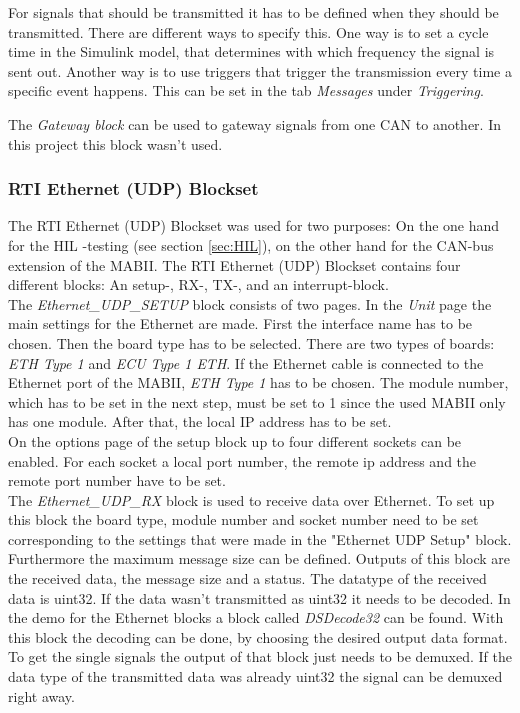 \documentclass[ExampleMasters.tex]{subfiles}
\begin{document}
For signals that should be transmitted it has to be defined when they should be transmitted. There are different ways to specify this. One way is to set a cycle time in the Simulink model, that determines with which frequency the signal is sent out. Another way is to use triggers that trigger the transmission every time a specific event happens. This can be set in the tab \textit{Messages} under \textit{Triggering}.

The \textit{Gateway block} can be used to gateway signals from one \gls{CAN} to another. In this project this block wasn't used. 
\subsubsection{RTI Ethernet (UDP) Blockset}
The \gls{RTI} Ethernet (\gls{UDP}) Blockset was used for two purposes: On the one hand for the \gls{HIL} -testing (see section \ref{sec:HIL}), on the other hand for the \gls{CAN}-bus extension of the \gls{MABII}. The \gls{RTI} Ethernet (UDP) Blockset contains four different blocks: An setup-, RX-, TX-, and an interrupt-block.\\
The \textit{Ethernet\_UDP\_SETUP} block consists of two pages. In the \textit{Unit} page the main settings for the Ethernet are made. First the interface name has to be chosen. Then the board type has to be selected. There are two types of boards: \textit{ETH Type 1} and \textit{ECU Type 1 ETH}. If the Ethernet cable is connected to the Ethernet port of the \gls{MABII}, \textit{ETH Type 1} has to be chosen. The module number, which has to be set in the next step, must be set to 1 since the used \gls{MABII} only has one module.
After that, the local \gls{IP} address has to be set.\\
On the options page of the setup block up to four different sockets can be enabled. For each socket a local port number, the remote ip address and the remote port number have to be set.\\
 
The \textit{Ethernet\_UDP\_RX} block is used to receive data over Ethernet. To set up this block the board type, module number and socket number need to be set corresponding to the settings that were made in the "Ethernet \gls{UDP} Setup" block. Furthermore the maximum message size can be defined. Outputs of this block are the received data, the message size and a status. The datatype of the received data is uint32. If the data wasn't transmitted as uint32 it needs to be decoded. In the demo for the Ethernet blocks a block called \textit{DSDecode32} can be found. With this block the decoding can be done, by choosing the desired output data format. To get the single signals the output of that block just needs to be demuxed. If the data type of the transmitted data was already uint32 the signal can be demuxed right away.
\end{document}
